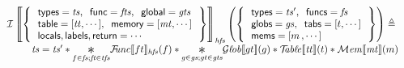 \documentclass{standalone}
\begin{document}
\flushleft


\[
\begin{array}{l}
%
  \Ivalid \left\llbracket
  \record{ \begin{array}{l}
             \xxfield{types} = \V{ts}, \;\;
             \xxfield{func} = \V{fts}, \;\;
             \xxfield{global} = \V{gts}\\
             \xxfield{table} = [\V{tt}, \cdots], \;\;
             \xxfield{memory} = [\V{mt}, \cdots]\\
             \xxfield{locals},\xxfield{labels},\xxfield{return} = \cdots \end{array} } \right\rrbracket_{\V{hfs}}\left(
  \record{\begin{array}{l}
    \xxfield{types} = \V{ts}', \;\;
    \xxfield{funcs} = \V{fs}\\
    \xxfield{globs} = \V{gs}, \;\;
    \xxfield{tabs} = [t, \cdots] \\
    \xxfield{mems} = [m\,, \cdots]
  \end{array}}\right) \triangleq
  \\[.5em]
  \qquad{}
  \begin{array}{l}
    \V{ts} = \V{ts}'
    \ast
    \displaystyle \underset{f \in \V{fs}; \V{ft} \in \V{tfs}}{\Conv} \Fvalid\llbracket ft \rrbracket_{\V{hfs}}(f)
    \ast
    \displaystyle \underset{g \in \V{gs}; gt \in \V{gts}}{\Conv} \Gvalid\llbracket gt \rrbracket(g)
    \ast
    \Tvalid \llbracket \V{tt} \rrbracket(t)
    \ast
    \Mvalid \llbracket \V{mt} \rrbracket(m)
  \end{array}
	
%
\end{array}
\]
\end{document}
